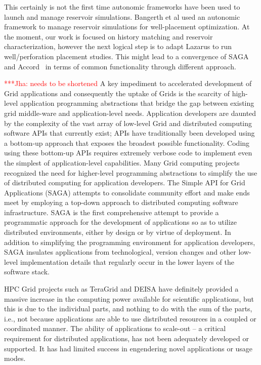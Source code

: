 \documentclass[conference,final]{IEEEtran}
\newcommand{\jhanote}[1]{ {\textcolor{red} { ***Jha: #1 }}}
\newcommand{\yyenote}[1]{ {\textcolor{blue} { ***yye00: #1 }}}
\newcommand{\jhanote}[1]{}
\newcommand{\yyenote}[1]{}
\begin{document}
This certainly is not the first time autonomic frameworks have been
used to launch and manage reservoir simulations. Bangerth et al
\cite{Manish} used an autonomic framework to manage reservoir
simulations for well-placement optimization. At the moment, our work
is focused on history matching and reservoir characterization, however
the next logical step is to adapt Lazarus to run well/perforation
placement studies. This might lead to a convergence of SAGA and
Accord~\cite{accord} in terms of common functionality through
different approach.

\jhanote{needs to be shortened} A key impediment to accelerated
development of Grid applications and consequently the uptake of Grids
is the scarcity of high-level application programming abstractions
that bridge the gap between existing grid middle-ware and
application-level needs.  Application developers are daunted by the
complexity of the vast array of low-level Grid and distributed
computing software APIs that currently exist; APIs have traditionally
been developed using a bottom-up approach that exposes the broadest
possible functionality.  Coding using these bottom-up APIs requires
extremely verbose code to implement even the simplest of
application-level capabilities.  Many Grid computing
projects~\cite{gat, cog, realitygrid} recognized the need for
higher-level programming abstractions to simplify the use of
distributed computing for application developers.  The Simple API for
Grid Applications (SAGA) attempts to consolidate community effort and
make ends meet by employing a top-down approach to distributed
computing software infrastructure.  SAGA is the first comprehensive
attempt to provide a programmatic approach for the development of
applications so as to utilize distributed environments, either by
design or by virtue of deployment.  In addition to simplifying the
programming environment for application developers, SAGA insulates
applications from technological, version changes and other low-level
implementation details that regularly occur in the lower layers of the
software stack.

HPC Grid projects such as TeraGrid and DEISA have definitely provided
a massive increase in the computing power available for scientific
applications, but this is due to the individual parts, and nothing to
do with the sum of the parts, i.e., not because applications are able
to use distributed resources in a coupled or coordinated manner. The
ability of applications to scale-out -- a critical requirement for
distributed applications, has not been adequately developed or
supported. It has had limited success in engendering novel
applications or usage modes.
\end{document}
